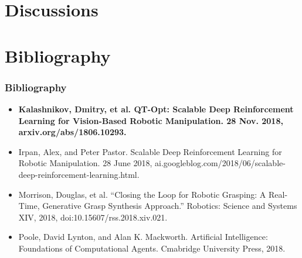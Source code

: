 \documentclass{beamer}
\newcommand{\seventhSec}{Discussions}
\newcommand{\refSec}{Bibliography}
\begin{document}
  \section{\seventhSec}


  \section{\refSec}
    \begin{frame}[allowframebreaks]
      \frametitle{\refSec}
      \begin{itemize}
        \item \textbf{Kalashnikov, Dmitry, et al. QT-Opt: Scalable Deep Reinforcement Learning for Vision-Based Robotic Manipulation. 28 Nov. 2018, arxiv.org/abs/1806.10293.}
        \item Irpan, Alex, and Peter Pastor. Scalable Deep Reinforcement Learning for Robotic Manipulation. 28 June 2018, ai.googleblog.com/2018/06/scalable-deep-reinforcement-learning.html.
        \item Morrison, Douglas, et al. “Closing the Loop for Robotic Grasping: A Real-Time, Generative Grasp Synthesis Approach.” Robotics: Science and Systems XIV, 2018, doi:10.15607/rss.2018.xiv.021.
        \item Poole, David Lynton, and Alan K. Mackworth. Artificial Intelligence: Foundations of Computational Agents. Cmabridge University Press, 2018.
      \end{itemize}
    \end{frame}
\end{document}
